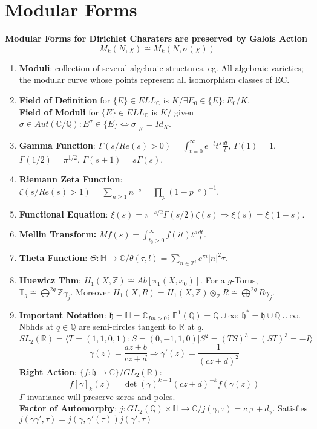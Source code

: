 \documentclass{article}
\newcommand{\Q}{\mathbb{Q}}
\newcommand{\R}{\mathbb{R}}
\newcommand{\C}{\mathbb{C}}
\newcommand{\Z}{\mathbb{Z}}
\newcommand{\HH}{\mathbb{H}}
\newcommand{\hh}{\mathfrak{h}}
\newcommand{\PP}{\mathbb{P}}
\newcommand{\ra}{\rightarrow}
\newcommand{\Ra}{\Rightarrow}
\newcommand{\Lra}{\Leftrightarrow}
\begin{document}
\section{Modular Forms}
\textbf{Modular Forms for Dirichlet Charaters are preserved by Galois Action} 
\[M_k(N,\chi) \cong M_k(N,\sigma(\chi))\]


\begin{multicols}{2}
\begin{enumerate}
\item \textbf{Moduli}: collection of several algebraic structures. eg. All algebraic varieties; the modular curve whose points represent all isomorphism classes of EC. 

\item \textbf{Field of Definition} for $\{E\} \in ELL_\C$ is $K/\exists E_0 \in \{E\}: E_0/K$.\\
\textbf{Field of Moduli} for $\{E\} \in ELL_\C$ is $K/$ given $\sigma \in Aut(\C/\Q): E^\sigma \in \{E\} \Lra \sigma|_K = Id_K$. 
\item \textbf{Gamma Function}: $\Gamma(s/Re(s) > 0) = \int_{t = 0}^\infty e^{-t} t^s \frac{dt}{t}$, $\Gamma(1) =1$, $\Gamma(1/2) = \pi^{1/2}$, $\Gamma(s+1)=s\Gamma(s)$. 
\item \textbf{Riemann Zeta Function}: $\zeta(s/Re(s) > 1) = \sum_{n \geq 1} n^{-s} = \prod_p (1-p^{-s})^{-1}$. 
\item \textbf{Functional Equation}:
$\xi(s) = \pi^{-s/2} \Gamma(s/2)\zeta(s) \Ra \xi(s) = \xi(1-s)$.
\item \textbf{Mellin Transform:} $Mf(s) = \int_{t_0 > 0}^\infty f(it) t^s \frac{dt}{t}$.

\item \textbf{Theta Function}: $\Theta: \HH \ra \C/ \theta(\tau,l) = \sum_{n \in \Z^l} e^{\pi i}|n|^2 \tau$.

\item \textbf{Huewicz Thm}: $H_1(X,\Z) \cong Ab[\pi_1(X,x_0)]$. For a $g$-Torus, $\mathbb{T}_g \cong \bigoplus^{2g} \Z \gamma_j$. Moreover $H_1(X,R) = H_1(X,\Z) \otimes_\Z R \cong \bigoplus^{2g} R \gamma_j$. 

\item \textbf{Important Notation}: $\hh = \HH = \C_{Im>0}$; $\PP^1(\Q) = \Q \cup \infty$; $\hh^* = \hh \cup \Q \cup \infty$. Nbhds at $q \in \Q$ are semi-circles tangent to $\R$ at $q$.  
\[SL_2(\R) = \langle T = (1,1,0,1); S = (0,-1,1,0) | S^2 = (TS)^3 = (ST)^3 = -I\rangle\]
\[\gamma(z) = \frac{az+b}{cz+d} \Ra \gamma'(z) = \frac{1}{(cz+d)^2}\]
\textbf{Right Action}: $\{f:\hh \ra \C\}/GL_2(\R)$: 
\[f[\gamma]_k(z) = \det(\gamma)^{k-1} (cz+d)^{-k} f(\gamma(z))\]
$\Gamma$-invariance will preserve zeros and poles.\\
\textbf{Factor of Automorphy}: $j:GL_2(\Q) \times \HH \ra \C/ j(\gamma,\tau) = c_\gamma\tau + d_\gamma$. Satisfies $j(\gamma\gamma',\tau) = j(\gamma,\gamma'(\tau))j(\gamma',\tau)$
 

\end{enumerate}
\end{multicols}
\end{document}
